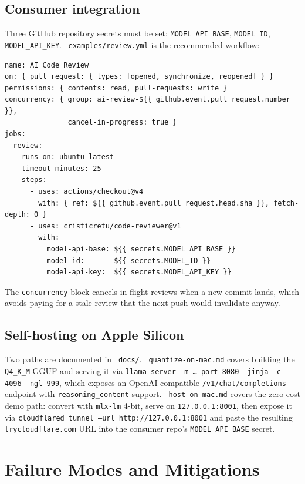\documentclass[11pt,a4paper]{article}
\newcommand{\code}[1]{\texttt{\small #1}}
\renewcommand{\path}[1]{\texttt{\small\color{mute} #1}}
\begin{document}
\subsection{Consumer integration}

Three GitHub repository secrets must be set: \code{MODEL\_API\_BASE},
\code{MODEL\_ID}, \code{MODEL\_API\_KEY}. \path{examples/review.yml}
is the recommended workflow:

\begin{lstlisting}
name: AI Code Review
on: { pull_request: { types: [opened, synchronize, reopened] } }
permissions: { contents: read, pull-requests: write }
concurrency: { group: ai-review-${{ github.event.pull_request.number }},
               cancel-in-progress: true }
jobs:
  review:
    runs-on: ubuntu-latest
    timeout-minutes: 25
    steps:
      - uses: actions/checkout@v4
        with: { ref: ${{ github.event.pull_request.head.sha }}, fetch-depth: 0 }
      - uses: cristicretu/code-reviewer@v1
        with:
          model-api-base: ${{ secrets.MODEL_API_BASE }}
          model-id:       ${{ secrets.MODEL_ID }}
          model-api-key:  ${{ secrets.MODEL_API_KEY }}
\end{lstlisting}

The \code{concurrency} block cancels in-flight reviews when a new commit
lands, which avoids paying for a stale review that the next push would
invalidate anyway.

\subsection{Self-hosting on Apple Silicon}

Two paths are documented in \path{docs/}. \path{quantize-on-mac.md}
covers building the \code{Q4\_K\_M} GGUF and serving it via
\code{llama-server -m \ldots --port 8080 --jinja -c 4096 -ngl 999}, which
exposes an OpenAI-compatible \code{/v1/chat/completions} endpoint with
\code{reasoning\_content} support. \path{host-on-mac.md} covers the
zero-cost demo path: convert with \code{mlx-lm} 4-bit, serve on
\code{127.0.0.1:8001}, then expose it via
\code{cloudflared tunnel --url http://127.0.0.1:8001} and paste the
resulting \code{trycloudflare.com} URL into the consumer repo's
\code{MODEL\_API\_BASE} secret.

\section{Failure Modes and Mitigations}
\end{document}
